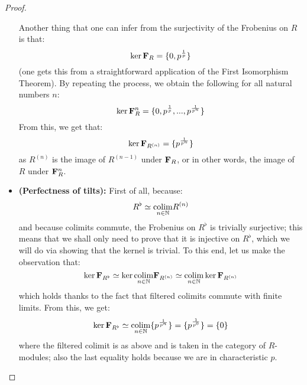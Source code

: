 \begin{proof}
\begin{itemize}
                                Another thing that one can infer from the surjectivity of the Frobenius on $R$ is that:
                                    $$\ker \mathbf{F}_R = \{0, p^{\frac1p}\}$$
                                (one gets this from a straightforward application of the First Isomorphism Theorem). By repeating the process, we obtain the following for all natural numbers $n$:
                                    $$\ker \mathbf{F}_R^n = \{0, p^{\frac1p}, ..., p^{\frac{1}{p^n}}\}$$
                                From this, we get that:
                                    $$\ker \mathbf{F}_{R^{(n)}} = \{p^{\frac{1}{p^n}}\}$$
                                as $R^{(n)}$ is the image of $R^{(n - 1)}$ under $\mathbf{F}_R$, or in other words, the image of $R$ under $\mathbf{F}_R^n$.
                                \item \textbf{(Perfectness of tilts):} First of all, because:
                                    $$R^{\flat} \simeq \underset{n \in \mathbb{N}}{\operatorname{colim}} R^{(n)}$$
                                and because colimits commute, the Frobenius on $R^{\flat}$ is trivially surjective; this means that we shall only need to prove that it is injective on $R^{\flat}$, which we will do via showing that the kernel is trivial. To this end, let us make the observation that:
                                    $$\ker \mathbf{F}_{R^{\flat}} \simeq \ker \underset{n \in \mathbb{N}}{\operatorname{colim}} \mathbf{F}_{R^{(n)}} \simeq \underset{n \in \mathbb{N}}{\operatorname{colim}} \ker \mathbf{F}_{R^{(n)}}$$
                                which holds thanks to the fact that filtered colimits commute with finite limits. From this, we get:
                                    $$\ker \mathbf{F}_{R^{\flat}} \simeq \underset{n \in \mathbb{N}}{\operatorname{colim}} \{p^{\frac{1}{p^n}}\} = \{p^{\frac{1}{p^0}}\} = \{0\}$$
                                where the filtered colimit is as above and is taken in the category of $R$-modules; also the last equality holds because we are in characteristic $p$.
                            \end{itemize}
                        \end{proof}
                    
